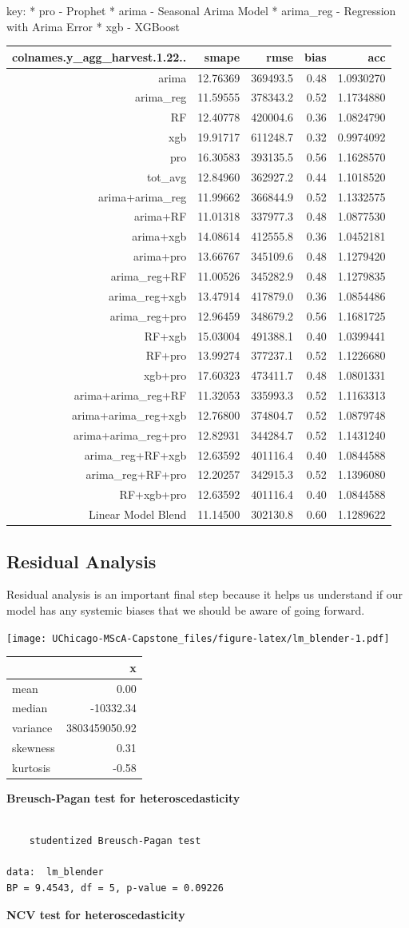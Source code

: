 \documentclass[12pt,oneside]{chicagocapstone}
\begin{document}
key: * pro - Prophet * arima - Seasonal Arima Model * arima\_reg -
Regression with Arima Error * xgb - XGBoost
\begin{longtable}[]{@{}rrrrr@{}}
\toprule
colnames.y\_agg\_harvest.1.22.. & smape & rmse & bias &
acc\tabularnewline
\midrule
\endhead
arima & 12.76369 & 369493.5 & 0.48 & 1.0930270\tabularnewline
arima\_reg & 11.59555 & 378343.2 & 0.52 & 1.1734880\tabularnewline
RF & 12.40778 & 420004.6 & 0.36 & 1.0824790\tabularnewline
xgb & 19.91717 & 611248.7 & 0.32 & 0.9974092\tabularnewline
pro & 16.30583 & 393135.5 & 0.56 & 1.1628570\tabularnewline
tot\_avg & 12.84960 & 362927.2 & 0.44 & 1.1018520\tabularnewline
arima+arima\_reg & 11.99662 & 366844.9 & 0.52 & 1.1332575\tabularnewline
arima+RF & 11.01318 & 337977.3 & 0.48 & 1.0877530\tabularnewline
arima+xgb & 14.08614 & 412555.8 & 0.36 & 1.0452181\tabularnewline
arima+pro & 13.66767 & 345109.6 & 0.48 & 1.1279420\tabularnewline
arima\_reg+RF & 11.00526 & 345282.9 & 0.48 & 1.1279835\tabularnewline
arima\_reg+xgb & 13.47914 & 417879.0 & 0.36 & 1.0854486\tabularnewline
arima\_reg+pro & 12.96459 & 348679.2 & 0.56 & 1.1681725\tabularnewline
RF+xgb & 15.03004 & 491388.1 & 0.40 & 1.0399441\tabularnewline
RF+pro & 13.99274 & 377237.1 & 0.52 & 1.1226680\tabularnewline
xgb+pro & 17.60323 & 473411.7 & 0.48 & 1.0801331\tabularnewline
arima+arima\_reg+RF & 11.32053 & 335993.3 & 0.52 &
1.1163313\tabularnewline
arima+arima\_reg+xgb & 12.76800 & 374804.7 & 0.52 &
1.0879748\tabularnewline
arima+arima\_reg+pro & 12.82931 & 344284.7 & 0.52 &
1.1431240\tabularnewline
arima\_reg+RF+xgb & 12.63592 & 401116.4 & 0.40 &
1.0844588\tabularnewline
arima\_reg+RF+pro & 12.20257 & 342915.3 & 0.52 &
1.1396080\tabularnewline
RF+xgb+pro & 12.63592 & 401116.4 & 0.40 & 1.0844588\tabularnewline
Linear Model Blend & 11.14500 & 302130.8 & 0.60 &
1.1289622\tabularnewline
\bottomrule
\end{longtable}
\subsection*{Residual Analysis}\label{findings-Residual-Analysis}

Residual analysis is an important final step because it helps us
understand if our model has any systemic biases that we should be aware
of going forward.

\texttt{[image: UChicago-MScA-Capstone\_files/figure-latex/lm\_blender-1.pdf]}
\begin{longtable}[]{@{}lr@{}}
\toprule
& x\tabularnewline
\midrule
\endhead
mean & 0.00\tabularnewline
median & -10332.34\tabularnewline
variance & 3803459050.92\tabularnewline
skewness & 0.31\tabularnewline
kurtosis & -0.58\tabularnewline
\bottomrule
\end{longtable}
\textbf{Breusch-Pagan test for heteroscedasticity}
\begin{verbatim}

    studentized Breusch-Pagan test

data:  lm_blender
BP = 9.4543, df = 5, p-value = 0.09226
\end{verbatim}
\textbf{NCV test for heteroscedasticity}
\end{document}
